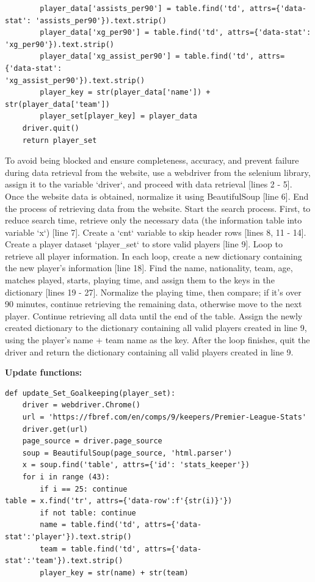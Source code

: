 \documentclass[12pt]{report}
\begin{document}
{\begin{lstlisting}
        player_data['assists_per90'] = table.find('td', attrs={'data-stat': 'assists_per90'}).text.strip()
        player_data['xg_per90'] = table.find('td', attrs={'data-stat': 'xg_per90'}).text.strip()
        player_data['xg_assist_per90'] = table.find('td', attrs={'data-stat':
'xg_assist_per90'}).text.strip()
        player_key = str(player_data['name']) + str(player_data['team'])
        player_set[player_key] = player_data
    driver.quit()
    return player_set
\end{lstlisting}
To avoid being blocked and ensure completeness, accuracy, and prevent failure during data retrieval from the website, use a webdriver from the selenium library, assign it to the variable `driver`, and proceed with data retrieval [lines 2 - 5]. Once the website data is obtained, normalize it using BeautifulSoup [line 6]. End the process of retrieving data from the website. Start the search process. First, to reduce search time, retrieve only the necessary data (the information table into variable `x`) [line 7]. Create a `cnt` variable to skip header rows [lines 8, 11 - 14]. Create a player dataset `player\_set` to store valid players [line 9]. Loop to retrieve all player information. In each loop, create a new dictionary containing the new player's information [line 18]. Find the name, nationality, team, age, matches played, starts, playing time, and assign them to the keys in the dictionary [lines 19 - 27]. Normalize the playing time, then compare; if it's over 90 minutes, continue retrieving the remaining data, otherwise move to the next player. Continue retrieving all data until the end of the table. Assign the newly created dictionary to the dictionary containing all valid players created in line 9, using the player's name + team name as the key. After the loop finishes, quit the driver and return the dictionary containing all valid players created in line 9.

\textbf*{Update functions:} %

\begin{lstlisting}
def update_Set_Goalkeeping(player_set):
    driver = webdriver.Chrome()
    url = 'https://fbref.com/en/comps/9/keepers/Premier-League-Stats'
    driver.get(url)
    page_source = driver.page_source
    soup = BeautifulSoup(page_source, 'html.parser')
    x = soup.find('table', attrs={'id': 'stats_keeper'})
    for i in range (43):
        if i == 25: continue
table = x.find('tr', attrs={'data-row':f'{str(i)}'})
        if not table: continue
        name = table.find('td', attrs={'data-stat':'player'}).text.strip()
        team = table.find('td', attrs={'data-stat':'team'}).text.strip()
        player_key = str(name) + str(team)


\end{lstlisting}}
\end{document}
